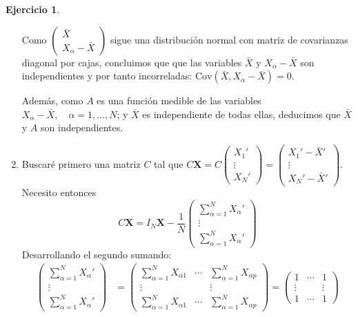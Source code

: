 \documentclass[12pt,spanish]{article}
\theoremstyle{definition}
\newtheorem{exercise}{Ejercicio}
\begin{document}
\begin{exercise}
\begin{enumerate}[$a)$]
    Como $\begin{pmatrix}
      \bar{X} \\ X_\alpha-\bar{X}
    \end{pmatrix}$ sigue una distribución normal con matriz de
    covarianzas diagonal por cajas, concluimos que que las variables
    $\bar{X}$ y $X_\alpha-\bar{X}$ son independientes y por tanto
    incorreladas: $\text{Cov}(\bar{X},X_\alpha-\bar{X})=0$.

    Además, como $A$ es una función medible de las variables
    $X_\alpha-\bar{X},\quad\alpha=1,\ldots,N$; y $\bar{X}$ es
    independiente de todas ellas, deducimos que $\bar{X}$ y $A$ son
    independientes.
    
  \item Buscaré primero una matriz $C$ tal que $C\textbf{X}=
    C\begin{pmatrix}
      X_1' \\ \vdots \\ X_N'
    \end{pmatrix}=
    \begin{pmatrix}
      X_1'-\bar{X}' \\ \vdots \\ X_N'-\bar{X}'
    \end{pmatrix}$. \\
    Necesito entonces \[C\textbf{X}=I_N\textbf{X}-\frac{1}{N}\begin{pmatrix}
      \sum_{\alpha=1}^N X_\alpha'\\ \vdots \\ \sum_{\alpha=1}^N X_\alpha'
    \end{pmatrix}
  \]
  Desarrollando el segundo sumando:
  \begin{align*}
    \begin{pmatrix}
      \sum_{\alpha=1}^N X_\alpha'\\ \vdots \\ \sum_{\alpha=1}^N X_\alpha'
    \end{pmatrix}&=
    \begin{pmatrix}
      \sum_{\alpha=1}^N X_{\alpha 1} & \cdots & \sum_{\alpha=1}^N X_{\alpha p} \\ \vdots & & \vdots \\ \sum_{\alpha=1}^N X_{\alpha 1} & \cdots & \sum_{\alpha=1}^N X_{\alpha p}
    \end{pmatrix}=
    \begin{pmatrix}
      1 & \cdots & 1 \\ \vdots & & \vdots \\ 1 & \cdots & 1

\end{pmatrix}
\end{align*}
\end{enumerate}
\end{exercise}
\end{document}
